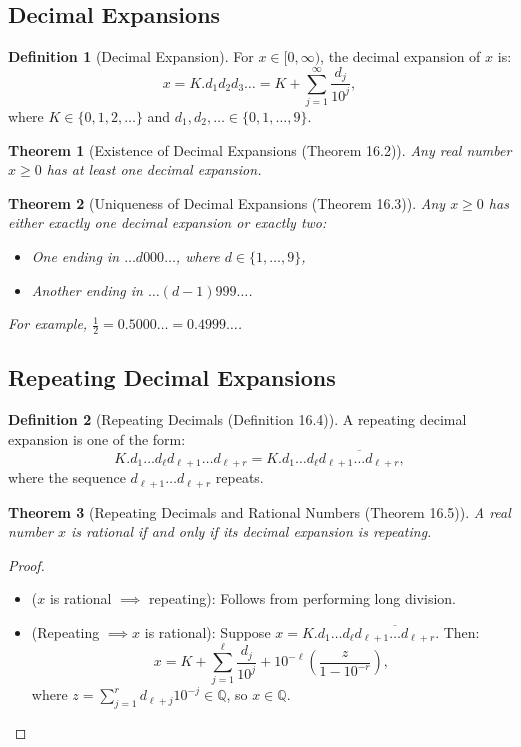 \documentclass[9pt]{article}
\theoremstyle{definition}
\newtheorem{definition}{Definition}
\theoremstyle{plain}
\newtheorem{theorem}{Theorem}
\begin{document}
\subsection*{Decimal Expansions}
\begin{definition}[Decimal Expansion]
For \( x \in [0, \infty) \), the decimal expansion of \( x \) is:
\[
x = K .d_1 d_2 d_3 \ldots = K + \sum_{j=1}^\infty \frac{d_j}{10^j},
\]
where \( K \in \{0, 1, 2, \ldots\} \) and \( d_1, d_2, \ldots \in \{0, 1, \ldots, 9\} \).
\end{definition}

\begin{theorem}[Existence of Decimal Expansions (Theorem 16.2)]
Any real number \( x \geq 0 \) has at least one decimal expansion.
\end{theorem}

\begin{theorem}[Uniqueness of Decimal Expansions (Theorem 16.3)]
Any \( x \geq 0 \) has either exactly one decimal expansion or exactly two:
\begin{itemize}
    \item One ending in \( \ldots d000 \ldots \), where \( d \in \{1, \ldots, 9\} \),
    \item Another ending in \( \ldots (d-1)999 \ldots \).
\end{itemize}
For example, \( \frac{1}{2} = 0.5000\ldots = 0.4999\ldots \).
\end{theorem}

\subsection*{Repeating Decimal Expansions}
\begin{definition}[Repeating Decimals (Definition 16.4)]
A repeating decimal expansion is one of the form:
\[
K .d_1 \ldots d_\ell d_{\ell+1} \ldots d_{\ell+r} = K .d_1 \ldots d_\ell \overline{d_{\ell+1} \ldots d_{\ell+r}},
\]
where the sequence \( d_{\ell+1} \ldots d_{\ell+r} \) repeats.
\end{definition}

\begin{theorem}[Repeating Decimals and Rational Numbers (Theorem 16.5)]
A real number \( x \) is rational if and only if its decimal expansion is repeating.
\end{theorem}

\begin{proof}
\leavevmode
\begin{itemize}
    \item (\( x \) is rational \( \implies \) repeating): Follows from performing long division.
    \item (Repeating \( \implies x \) is rational): Suppose \( x = K .d_1 \ldots d_\ell \overline{d_{\ell+1} \ldots d_{\ell+r}} \). Then:
    \[
    x = K + \sum_{j=1}^\ell \frac{d_j}{10^j} + 10^{-\ell} \left( \frac{z}{1 - 10^{-r}} \right),
    \]
    where \( z = \sum_{j=1}^r d_{\ell+j} 10^{-j} \in \mathbb{Q} \), so \( x \in \mathbb{Q} \).
\end{itemize}
\end{proof}
\end{document}
